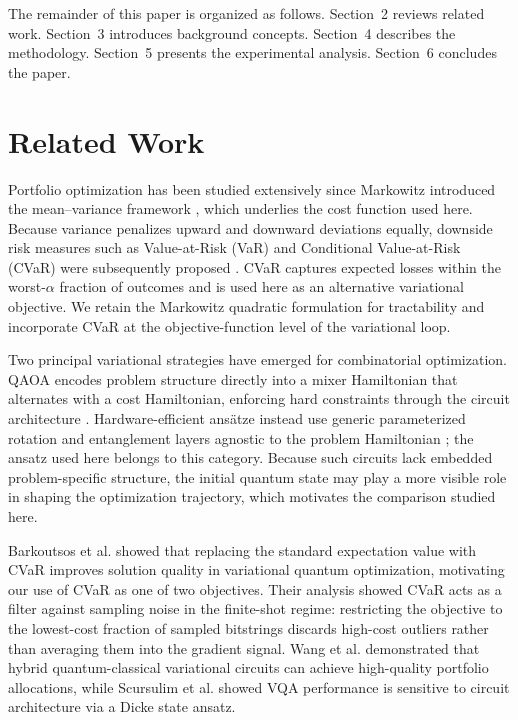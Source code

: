 \documentclass[runningheads]{llncs}
\begin{document}
The remainder of this paper is organized as follows. Section~2 reviews related work.
Section~3 introduces background concepts.
Section~4 describes the methodology.
Section~5 presents the experimental analysis.
Section~6 concludes the paper.

\section{Related Work}

Portfolio optimization has been studied extensively since Markowitz introduced the mean--variance framework \cite{markowitz1952}, which underlies the cost function used here. Because variance penalizes upward and downward deviations equally, downside risk measures such as Value-at-Risk (VaR) and Conditional Value-at-Risk (CVaR) were subsequently proposed \cite{rockafellar2000}. CVaR captures expected losses within the worst-$\alpha$ fraction of outcomes and is used here as an alternative variational objective. We retain the Markowitz quadratic formulation for tractability and incorporate CVaR at the objective-function level of the variational loop.

Two principal variational strategies have emerged for combinatorial optimization. QAOA encodes problem structure directly into a mixer Hamiltonian that alternates with a cost Hamiltonian, enforcing hard constraints through the circuit architecture \cite{Farhi2014}. Hardware-efficient ans\"atze instead use generic parameterized rotation and entanglement layers agnostic to the problem Hamiltonian \cite{kandala2017hardware}; the ansatz used here belongs to this category. Because such circuits lack embedded problem-specific structure, the initial quantum state may play a more visible role in shaping the optimization trajectory, which motivates the comparison studied here.

Barkoutsos et al. \cite{barkoutsos2020} showed that replacing the standard expectation value with CVaR improves solution quality in variational quantum optimization, motivating our use of CVaR as one of two objectives. Their analysis showed CVaR acts as a filter against sampling noise in the finite-shot regime: restricting the objective to the lowest-cost fraction of sampled bitstrings discards high-cost outliers rather than averaging them into the gradient signal. Wang et al. \cite{wang2025} demonstrated that hybrid quantum-classical variational circuits can achieve high-quality portfolio allocations, while Scursulim et al. \cite{scursulim2026} showed VQA performance is sensitive to circuit architecture via a Dicke state ansatz.
\end{document}

